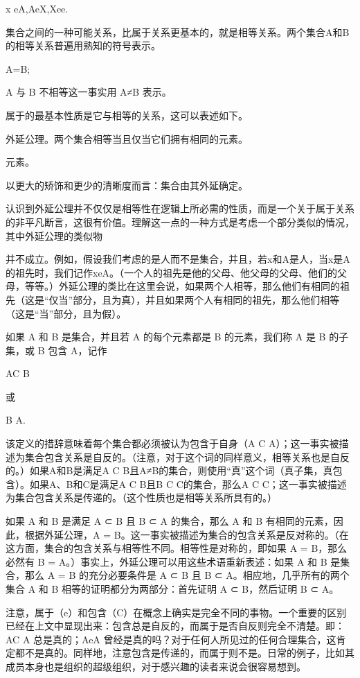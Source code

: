 \documentclass[12pt,a4paper]{ctexbook}
\theoremstyle{definition}
\theoremstyle{remark}
\begin{document}
x eA,AeX,Xee.

集合之间的一种可能关系，比属于关系更基本的，就是相等关系。两个集合A和B的相等关系普遍用熟知的符号表示。

A=B;

A 与 B 不相等这一事实用 A≠B 表示。

属于的最基本性质是它与相等的关系，这可以表述如下。

外延公理。两个集合相等当且仅当它们拥有相同的元素。

元素。

以更大的矫饰和更少的清晰度而言：集合由其外延确定。

认识到外延公理并不仅仅是相等性在逻辑上所必需的性质，而是一个关于属于关系的非平凡断言，这很有价值。理解这一点的一种方式是考虑一个部分类似的情况，其中外延公理的类似物

并不成立。例如，假设我们考虑的是人而不是集合，并且，若x和A是人，当x是A的祖先时，我们记作xeA。（一个人的祖先是他的父母、他父母的父母、他们的父母，等等。）外延公理的类比在这里会说，如果两个人相等，那么他们有相同的祖先（这是“仅当”部分，且为真），并且如果两个人有相同的祖先，那么他们相等（这是“当”部分，且为假）。

如果 A 和 B 是集合，并且若 A 的每个元素都是 B 的元素，我们称 A 是 B 的子集，或 B 包含 A，记作

AC B

或

B A.

该定义的措辞意味着每个集合都必须被认为包含于自身（A C A）；这一事实被描述为集合包含关系是自反的。（注意，对于这个词的同样意义，相等关系也是自反的。）如果A和B是满足A C B且A≠B的集合，则使用“真”这个词（真子集，真包含）。如果A、B和C是满足A C B且B C C的集合，那么A C C；这一事实被描述为集合包含关系是传递的。（这个性质也是相等关系所具有的。）

如果 A 和 B 是满足 A ⊂ B 且 B ⊂ A 的集合，那么 A 和 B 有相同的元素，因此，根据外延公理，A = B。这一事实被描述为集合的包含关系是反对称的。（在这方面，集合的包含关系与相等性不同。相等性是对称的，即如果 A = B，那么必然有 B = A。）事实上，外延公理可以用这些术语重新表述：如果 A 和 B 是集合，那么 A = B 的充分必要条件是 A ⊂ B 且 B ⊂ A。相应地，几乎所有的两个集合 A 和 B 相等的证明都分为两部分：首先证明 A ⊂ B，然后证明 B ⊂ A。

注意，属于（e）和包含（C）在概念上确实是完全不同的事物。一个重要的区别已经在上文中显现出来：包含总是自反的，而属于是否自反则完全不清楚。即：AC A 总是真的；AeA 曾经是真的吗？对于任何人所见过的任何合理集合，这肯定都不是真的。同样地，注意包含是传递的，而属于则不是。日常的例子，比如其成员本身也是组织的超级组织，对于感兴趣的读者来说会很容易想到。
\end{document}
